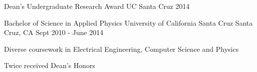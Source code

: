   
        \begin{cvhonors}
          \cvhonor
            {Dean's Undergraduate Research Award}
            {}
            {UC Santa Cruz}
            {2014}
        \end{cvhonors}

        \begin{cventries}
          \cventry
            {Bachelor of Science in Applied Physics}
            {University of California Santa Cruz}
            {Santa Cruz, CA}
            {Sept 2010 - June 2014}
            {
              \begin{cvitems}
                \item {Diverse coursework in Electrical Engineering, Computer Science and Physics}
                \item{Twice received Dean's Honors}
              \end{cvitems}
            }
        \end{cventries}
